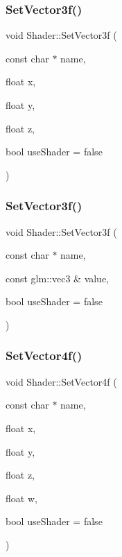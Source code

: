 \mbox{\label{classShader_ac1dbbe3e0134b04c9decf1974252f07b}} 
\subsubsection{\texorpdfstring{Set\+Vector3f()}{SetVector3f()}\hspace{0.1cm}{\footnotesize\ttfamily [1/2]}}
{\footnotesize\ttfamily void Shader\+::\+Set\+Vector3f (\begin{DoxyParamCaption}\item[{const char $\ast$}]{name,  }\item[{float}]{x,  }\item[{float}]{y,  }\item[{float}]{z,  }\item[{bool}]{use\+Shader = {\ttfamily false} }\end{DoxyParamCaption})}

\mbox{\label{classShader_a996865767a7485cb63bbd979bb1bc252}} 
\subsubsection{\texorpdfstring{Set\+Vector3f()}{SetVector3f()}\hspace{0.1cm}{\footnotesize\ttfamily [2/2]}}
{\footnotesize\ttfamily void Shader\+::\+Set\+Vector3f (\begin{DoxyParamCaption}\item[{const char $\ast$}]{name,  }\item[{const glm\+::vec3 \&}]{value,  }\item[{bool}]{use\+Shader = {\ttfamily false} }\end{DoxyParamCaption})}

\mbox{\label{classShader_a9fd94ef003bab74c968ebde2c9c542b4}} 
\subsubsection{\texorpdfstring{Set\+Vector4f()}{SetVector4f()}\hspace{0.1cm}{\footnotesize\ttfamily [1/2]}}
{\footnotesize\ttfamily void Shader\+::\+Set\+Vector4f (\begin{DoxyParamCaption}\item[{const char $\ast$}]{name,  }\item[{float}]{x,  }\item[{float}]{y,  }\item[{float}]{z,  }\item[{float}]{w,  }\item[{bool}]{use\+Shader = {\ttfamily false} }\end{DoxyParamCaption})}

